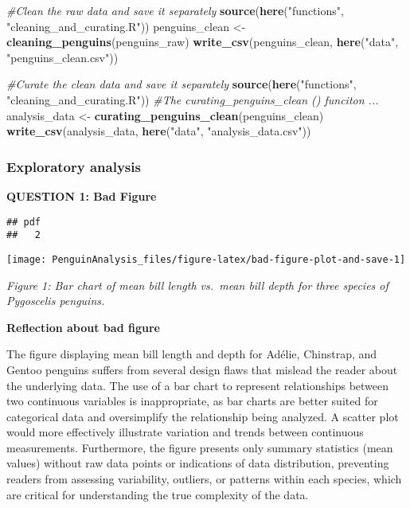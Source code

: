 \documentclass[
]{article}
\newenvironment{Shaded}{\begin{snugshade}}{\end{snugshade}}
\newcommand{\CommentTok}[1]{\textcolor[rgb]{0.56,0.35,0.01}{\textit{#1}}}
\newcommand{\FunctionTok}[1]{\textcolor[rgb]{0.13,0.29,0.53}{\textbf{#1}}}
\newcommand{\NormalTok}[1]{#1}
\newcommand{\OtherTok}[1]{\textcolor[rgb]{0.56,0.35,0.01}{#1}}
\newcommand{\StringTok}[1]{\textcolor[rgb]{0.31,0.60,0.02}{#1}}
\begin{document}
\begin{Shaded}
\begin{Highlighting}[]
\CommentTok{\#Clean the raw data and save it separately}
\FunctionTok{source}\NormalTok{(}\FunctionTok{here}\NormalTok{(}\StringTok{"functions"}\NormalTok{, }\StringTok{"cleaning\_and\_curating.R"}\NormalTok{))}
\NormalTok{penguins\_clean }\OtherTok{\textless{}{-}} \FunctionTok{cleaning\_penguins}\NormalTok{(penguins\_raw)}
\FunctionTok{write\_csv}\NormalTok{(penguins\_clean, }\FunctionTok{here}\NormalTok{(}\StringTok{"data"}\NormalTok{, }\StringTok{"penguins\_clean.csv"}\NormalTok{))}
\end{Highlighting}
\end{Shaded}

\begin{Shaded}
\begin{Highlighting}[]
\CommentTok{\#Curate the clean data and save it separately}
\FunctionTok{source}\NormalTok{(}\FunctionTok{here}\NormalTok{(}\StringTok{"functions"}\NormalTok{, }\StringTok{"cleaning\_and\_curating.R"}\NormalTok{))}
\CommentTok{\#The curating\_penguins\_clean () funciton ...}
\NormalTok{analysis\_data }\OtherTok{\textless{}{-}} \FunctionTok{curating\_penguins\_clean}\NormalTok{(penguins\_clean)}
\FunctionTok{write\_csv}\NormalTok{(analysis\_data, }\FunctionTok{here}\NormalTok{(}\StringTok{"data"}\NormalTok{, }\StringTok{"analysis\_data.csv"}\NormalTok{))}
\end{Highlighting}
\end{Shaded}

\subsubsection{Exploratory analysis}\label{exploratory-analysis}

\textbf{QUESTION 1: Bad Figure}

\begin{verbatim}
## pdf 
##   2
\end{verbatim}

\begin{center}\texttt{[image: PenguinAnalysis\_files/figure-latex/bad-figure-plot-and-save-1]} \end{center}

\emph{Figure 1: Bar chart of mean bill length vs.~mean bill depth for
three species of \emph{Pygoscelis} penguins.}

\textbf{Reflection about bad figure}

The figure displaying mean bill length and depth for Adélie, Chinstrap,
and Gentoo penguins suffers from several design flaws that mislead the
reader about the underlying data. The use of a bar chart to represent
relationships between two continuous variables is inappropriate, as bar
charts are better suited for categorical data and oversimplify the
relationship being analyzed. A scatter plot would more effectively
illustrate variation and trends between continuous measurements.
Furthermore, the figure presents only summary statistics (mean values)
without raw data points or indications of data distribution, preventing
readers from assessing variability, outliers, or patterns within each
species, which are critical for understanding the true complexity of the
data.
\end{document}
